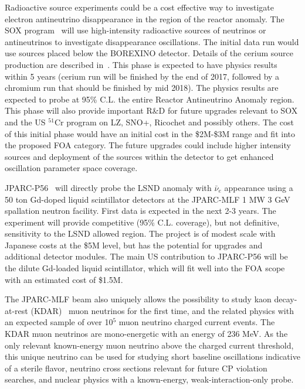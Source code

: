 \noindent Radioactive source experiments could be a cost effective way to investigate electron antineutrino disappearance in the region of the reactor anomaly.
The SOX program~\cite{bib:SOX} will use high-intensity radioactive sources of neutrinos or antineutrinos to investigate disappearance oscillations.  The initial data run would use sources placed below the BOREXINO detector.  Details of the cerium source production are described in~\cite{bib:CL}. This phase is expected to have physics results within 5 years (cerium run will be finished by the end of 2017, followed by a chromium run that should be finished by mid 2018).  The physics results are expected to probe at 95\% C.L. the entire Reactor Antineutrino Anomaly region. This phase will also provide important R\&D for future upgrades relevant to SOX and the US $^{51}$Cr program on LZ, SNO+, Ricochet and possibly others.  The cost of this initial phase would have an initial cost in the \$2M-\$3M range and fit into the proposed FOA category.  The future upgrades could include higher intensity sources and deployment of the sources within the detector to get enhanced oscillation parameter space coverage.


\noindent JPARC-P56~\cite{JPARC_P_56} will directly probe the LSND anomaly with $\bar\nu_e$ appearance using a 50 ton Gd-doped liquid scintillator detectors at the JPARC-MLF 1 MW 3 GeV spallation neutron facility.  First data is expected in the next 2-3 years. The experiment will provide competitive (95\% C.L. coverage), but not definitive, sensitivity to the LSND allowed region. The project is of modest scale with Japanese costs at the \$5M level, but has the potential for upgrades and additional detector modules.   The main US contribution to JPARC-P56 will be the dilute Gd-loaded liquid scintillator, which will fit well into the FOA scope with an estimated cost of \$1.5M.

The JPARC-MLF beam also uniquely allows the possibility to study kaon decay-at-rest (KDAR)~\cite{KDAR} muon neutrinos for the first time, and the related physics with an expected sample of over 10$^5$ muon neutrino charged current events.  The KDAR muon neutrinos are mono-energetic with an energy of 236 MeV.  As the only relevant known-energy muon neutrino above the charged current threshold, this unique neutrino can be used for studying short baseline oscillations indicative of a sterile flavor, neutrino cross sections relevant for future CP violation searches, and nuclear physics with a known-energy, weak-interaction-only probe.

